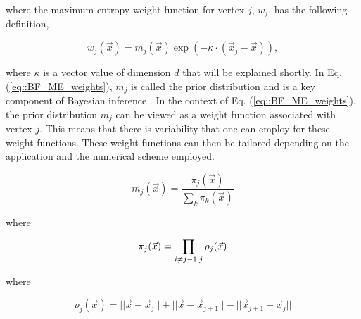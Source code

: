 \noindent where the maximum entropy weight function for vertex $j$, $w_j$, has the following definition,

\begin{equation}
\label{eq::BF_ME_weights}
w_j (\vec{x})  = m_j(\vec{x}) \exp(-  \kappa \cdot (\vec{x}_j - \vec{x})),
\end{equation}

\noindent where $\kappa$ is a vector value of dimension $d$ that will be explained shortly. In Eq. (\ref{eq::BF_ME_weights}), $m_j$ is called the prior distribution and is a key component of Bayesian inference \cite{kullback1951information,jaynes1963information}. In the context of Eq. (\ref{eq::BF_ME_weights}), the prior distribution $m_j$ can be viewed as a weight function associated with vertex $j$. This means that there is variability that one can employ for these weight functions. These weight functions can then be tailored depending on the application and the numerical scheme employed. 

\begin{equation}
\label{eq::BF_ME_prior_funcs}
 m_j(\vec{x}) = \frac{\pi_j (\vec{x}) }{\sum_{k} \pi_k (\vec{x})}
\end{equation}

\noindent where

\begin{equation}
\label{eq::BF_ME_prior_products}
\pi_j (\vec{x}) = \prod\displaylimits_{i \neq j-1, j} \rho_j (\vec{x})
\end{equation}

\noindent where

\begin{equation}
\label{eq::BF_ME_face_funcs}
\rho_j (\vec{x}) = || \vec{x} - \vec{x}_j || + || \vec{x} - \vec{x}_{j+1} || - || \vec{x}_{j+1} - \vec{x}_j ||
\end{equation}

